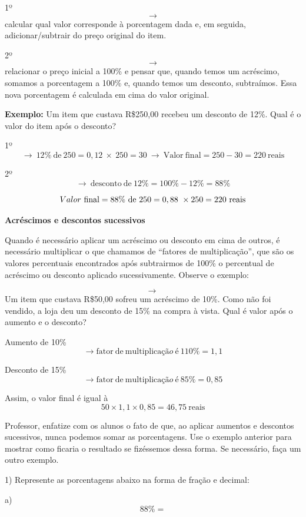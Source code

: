 1º \[\rightarrow\] calcular qual valor corresponde à porcentagem dada e,
em seguida, adicionar/subtrair do preço original do item.

2º \[\rightarrow\] relacionar o preço inicial a 100\% e pensar que,
quando temos um acréscimo, somamos a porcentagem a 100\% e, quando temos
um desconto, subtraímos. Essa nova porcentagem é calculada em cima do
valor original.

\textbf{Exemplo:} Um item que custava R\$250,00 recebeu um desconto de
12\%. Qual é o valor do item após o desconto?

1º
\[\rightarrow \ 12\%\ \text{de}\ 250 = 0,12\  \times \ 250 = 30\  \rightarrow \ \text{Valor}\ \text{final} = 250 - 30 = 220\ \text{reais}\]

2º
\[\rightarrow \ \text{desconto}\ \text{de}\ 12\% = 100\% - 12\% = 88\%\]

\[\\{Valor}\ \text{final} = 88\%\ \text{de}\ 250 = 0,88\  \times 250 = 220\ \text{reais}\]

\textbf{Acréscimos e descontos sucessivos}

Quando é necessário aplicar um acréscimo ou desconto em cima de outros,
é necessário multiplicar o que chamamos de ``fatores de multiplicação'',
que são os valores percentuais encontrados após subtrairmos de 100\% o
percentual de acréscimo ou desconto aplicado sucessivamente. Observe o
exemplo:

\[\rightarrow \ \]Um item que custava R\$50,00 sofreu um acréscimo de
10\%. Como não foi vendido, a loja deu um desconto de 15\% na compra à
vista. Qual é valor após o aumento e o desconto?

Aumento de 10\%
\[\rightarrow \text{fator}\ \text{de}\ \text{multiplica}ção\ é\ 110\% = 1,1\]

Desconto de 15\%
\[\rightarrow \text{fator}\ \text{de}\ \text{multiplica}ção\ é\ 85\% = 0,85\]

Assim, o valor final é igual à
\[50 \times 1,1 \times 0,85 = 46,75\ \text{reais}\]

Professor, enfatize com os alunos o fato de que, ao aplicar aumentos e
descontos sucessivos, nunca podemos somar as porcentagens. Use o exemplo
anterior para mostrar como ficaria o resultado se fizéssemos dessa
forma. Se necessário, faça um outro exemplo.


1) Represente as porcentagens abaixo na forma de fração e decimal:

a) \[88\% =\]

